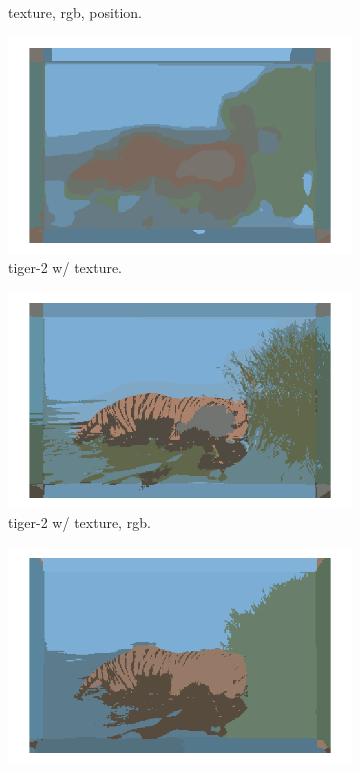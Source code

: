 \documentclass[12pt]{report}
\begin{document}
\begin{enumerate}
\begin{figure}[H]
\begin{subfigure}{0.3\linewidth}
      \caption{ texture, rgb, position.}
    \end{subfigure}
    \begin{subfigure}{0.3\linewidth}
      \includegraphics[width=\linewidth]{p1img3c.png}
      \caption{tiger-2 w/ texture.}
    \end{subfigure}
    \begin{subfigure}{0.3\linewidth}
      \includegraphics[width=\linewidth]{p2img3c.png}
      \caption{tiger-2 w/ texture, rgb.}
    \end{subfigure}
    \begin{subfigure}{0.3\linewidth}
      \includegraphics[width=\linewidth]{p3img3c.png}

\end{subfigure}
\end{figure}
\end{enumerate}
\end{document}
